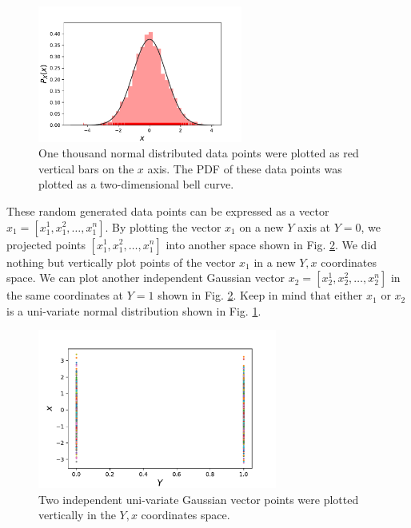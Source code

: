 \documentclass[preprint,12pt]{elsarticle}
\begin{document}
\begin{figure}[h!]
	\centering
		\includegraphics[trim=0.4cm 0.1cm 1.4cm 0.6cm, width=0.6\textwidth]{figs/1d_random.pdf}
    	\caption{One thousand normal distributed data points were plotted as red vertical bars on the $x$ axis. The PDF of these data points was plotted as a two-dimensional bell curve.}
    	\label{FIG:2}
\end{figure}

These random generated data points can be expressed as a vector $x_1=[x_1^1, x_1^2, \ldots, x_1^n]$. By plotting the vector $x_1$ on a new $Y$ axis at $Y = 0$, we projected points $[x_1^1, x_1^2, \ldots, x_1^n]$ into another space shown in Fig. \ref{FIG:3}. We did nothing but vertically plot points of the vector $x_1$ in a new $Y, x$ coordinates space. We can plot another independent Gaussian vector $x_2=[x_2^1, x_2^2, \ldots, x_2^n]$ in the same coordinates at $Y = 1$ shown in Fig. \ref{FIG:3}. Keep in mind that either $x_1$ or $x_2$ is a uni-variate normal distribution shown in Fig. \ref{FIG:2}. 

\begin{figure}[h!]
	\centering
		\includegraphics[width=0.7\textwidth]{figs/2gaussian.pdf}
	\caption{Two independent uni-variate Gaussian vector points were plotted vertically in the $Y, x$ coordinates space.}
	\label{FIG:3}
\end{figure}
\end{document}
